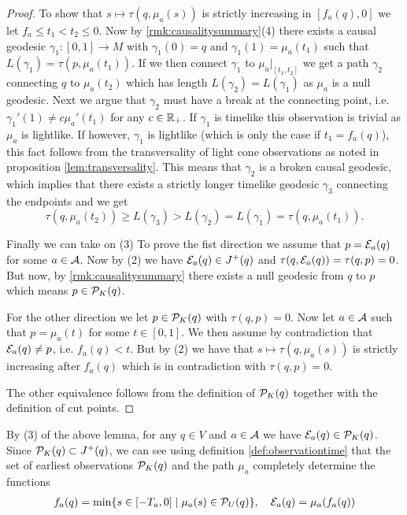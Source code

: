 \begin{proof}
To show that $s\mapsto \tau(q,\mu_a(s))$ is strictly increasing in $[f_a(q),0]$ we let $f_a\leq t_1<t_2\leq 0$. Now by \ref{rmk:causalitysummary}(4) there exists a causal geodesic $\gamma_1:[0,1]\to M$ with $\gamma_1(0)=q$ and $\gamma_1(1)=\mu_a(t_1)$ such that $L(\gamma_1)=\tau(p,\mu_a(t_1))$. 
If we then connect $\gamma_1$ to $\mu_a\rvert_{[t_1,t_2]}$ we get a path $\gamma_2$ connecting $q$ to $\mu_a(t_2)$ which has length $L(\gamma_2) = L(\gamma_1)$ as $\mu_a$ is a null geodesic. Next we argue that $\gamma_2$ must have a break at the connecting point, i.e. $\gamma_1'(1) \neq c\mu_a'(t_1)$ for any $c\in \R_+$. If $\gamma_1$ is timelike this observation is trivial as $\mu_a$ is lightlike. If however, $\gamma_1$ is lightlike (which is only the case if $t_1=f_a(q)$), this fact follows from the transversality of light cone observations as noted in proposition \ref{lem:transversality}. This means that $\gamma_2$ is a broken causal geodesic, which implies that there exists a strictly longer timelike geodesic $\gamma_3$ connecting the endpoints and we get
\[
\tau(q,\mu_a(t_2)) \geq L(\gamma_3) > L(\gamma_2) = L(\gamma_1) = \tau(q,\mu_a(t_1)).
\]

Finally we can take on (3)
To prove the fist direction we assume that $p=\mc{E}_a(q)$ for some $a\in \mc{A}$. Now by (2) we have $\mc{E}_a(q) \in J^+(q)$ and $\tau(q,\mc{E}_a(q))=\tau(q,p)=0$. But now, by \ref{rmk:causalitysummary} there exists a null geodesic from $q$ to $p$ which means $p\in \mc{P}_K(q)$. 

For the other direction we let $p\in \mc{P}_K(q)$ with $\tau(q,p)=0$. Now let $a\in \mc{A}$ such that $p=\mu_a(t)$ for some $t\in [0,1]$. We then assume by contradiction that $\mc{E}_a(q) \neq p$, i.e. $f_a(q) < t$. But by (2) we have that $s\mapsto\tau(q,\mu_a(s))$ is strictly increasing after $f_a(q)$ which is in contradiction with $\tau(q,p)=0$.

The other equivalence follows from the definition of $\mc{P}_K(q)$ together with the definition of cut points.
\end{proof}

By (3) of the above lemma, for any $q\in V$ and $a\in \ca$ we have $\mc{E}_a(q)\in \P_K(q)$. Since $\P_K(q)\subset J^+(q)$, we can see using definition \ref{def:observationtime} that the set of earliest observations $\P_K(q)$ and the path $\mu_a$ completely determine the functions
\begin{align}\label{eq:observationtimerestated}
    f_a(q) = \min \{ s\in [-T_a,0] \mid \mu_a(s)\in \P_U(q) \}, \quad \mc{E}_a(q) = \mu_a(f_a(q))
\end{align}

